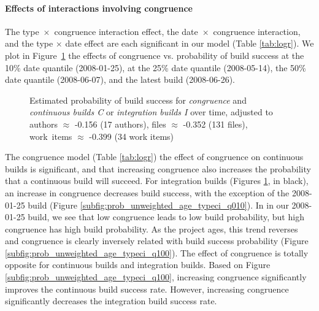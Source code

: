 \paragraph{Effects of interactions involving congruence}
\label{sec:congruenceinteractions}
The type~$\times$~congruence interaction effect, the date~$\times$~congruence interaction, and the type $\times$ date effect are each significant in our model (Table \ref{tab:logr}). We plot in Figure~\ref{fig:unweighted_congruence_typeci_age} the effects of congruence vs. probability of build success at the 10\% date quantile (2008-01-25), at the 25\% date quantile (2008-05-14), the 50\% date quantile (2008-06-07), and the latest build (2008-06-26).


\begin{figure}[t!]
\centering
  
	\caption{Estimated probability of build success for \emph{congruence} and \emph{continuous builds C} or \emph{integration builds I}  over time, adjusted to authors $\approx$ -0.156 (17 authors), files $\approx$ -0.352 (131 files), work~items $\approx$ -0.399 (34 work items)}
	\label{fig:unweighted_congruence_typeci_age}
\end{figure}

The congruence model (Table \ref{tab:logr}) the effect of congruence on continuous builds is significant, and that increasing congruence also increases the probability that a continuous build will succeed. 
For integration builds (Figures \ref{fig:unweighted_congruence_typeci_age}, in black), an increase in congruence decreases build success, with the exception of the 2008-01-25 build (Figure \ref{subfig:prob_unweighted_age_typeci_q010}). In in our 2008-01-25 build, we see that low congruence leads to low build probability, but high congruence has high build probability. As the project ages, this trend reverses and congruence is clearly inversely related with build success probability (Figure \ref{subfig:prob_unweighted_age_typeci_q100}).
The effect of congruence is totally opposite for continuous builds and integration builds. Based on Figure \ref{subfig:prob_unweighted_age_typeci_q100}, increasing congruence significantly improves the continuous build success rate. However, increasing congruence significantly decreases the integration build success rate.


